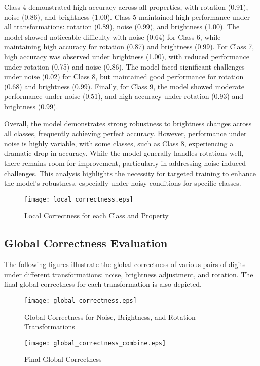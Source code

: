 Class 4 demonstrated high accuracy across all properties, with rotation (0.91), noise (0.86), and brightness (1.00). Class 5 maintained high performance under all transformations: rotation (0.89), noise (0.99), and brightness (1.00). The model showed noticeable difficulty with noise (0.64) for Class 6, while maintaining high accuracy for rotation (0.87) and brightness (0.99). For Class 7, high accuracy was observed under brightness (1.00), with reduced performance under rotation (0.75) and noise (0.86). The model faced significant challenges under noise (0.02) for Class 8, but maintained good performance for rotation (0.68) and brightness (0.99). Finally, for Class 9, the model showed moderate performance under noise (0.51), and high accuracy under rotation (0.93) and brightness (0.99).

Overall, the model demonstrates strong robustness to brightness changes across all classes, frequently achieving perfect accuracy. However, performance under noise is highly variable, with some classes, such as Class 8, experiencing a dramatic drop in accuracy. While the model generally handles rotations well, there remains room for improvement, particularly in addressing noise-induced challenges. This analysis highlights the necessity for targeted training to enhance the model's robustness, especially under noisy conditions for specific classes.

\begin{figure}[h]
    \centering
    \texttt{[image: local\_correctness.eps]}
    \caption{Local Correctness for each Class and Property}
    \label{fig:local_correctness}
\end{figure}
\subsection{Global Correctness Evaluation}
The following figures illustrate the global correctness of various pairs of digits under different transformations: noise, brightness adjustment, and rotation. The final global correctness for each transformation is also depicted.

\begin{figure}[H]
    \centering
    \texttt{[image: global\_correctness.eps]}
    \caption{Global Correctness for Noise, Brightness, and Rotation Transformations}
    \label{fig:global_correctness}
\end{figure}

\begin{figure}[H]
    \centering
    \texttt{[image: global\_correctness\_combine.eps]}
    \caption{Final Global Correctness}
    \label{fig:final_global_correctness}
\end{figure}

